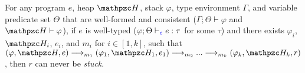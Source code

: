 
\begin{thm}\label{thm:blame} For any \systemname
  program $e$, heap $\heap$, stack
$\varphi$, type environment $\Gamma$, and variable predicate set $\Theta$
that are well-formed and consistent
($\Gamma;\Theta\vdash \varphi$ and $\heap \vdash \varphi$),
if $e$ is well-typed ($\varphi;\Theta\vdash_{\textcolor{blue}{\texttt{c}}} e :
\tau$ for some $\tau$) and there exists
$\varphi_i$, $\heap_i$, $e_i$, and $m_i$ for $i\in [1,k]$, such that
$(\varphi,\heap,e) \longrightarrow_{m_1} (\varphi_1,\heap_1,e_1)\longrightarrow_{m_2} ...\longrightarrow_{m_k} (\varphi_k,\heap_k,r)$, then $r$ can never be \emph{stuck}.
\end{thm}



